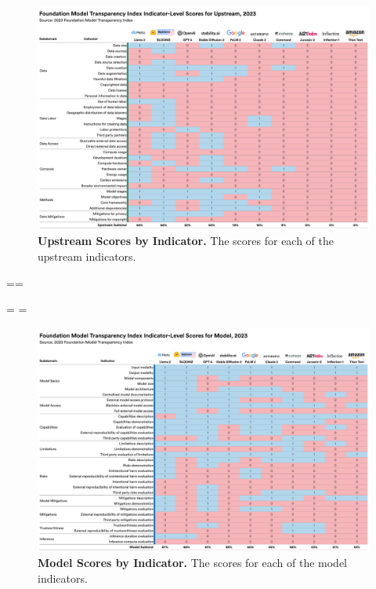 \begin{figure}
\begin{minipage}{\pdfpagewidth}
\includegraphics[keepaspectratio, width=0.85\pdfpagewidth]{figures/f10.pdf}
\end{minipage}
\caption{\textbf{Upstream Scores by Indicator.} The scores for each of the \numupstreamindicators upstream indicators.
}
\label{fig:upstream-scores}
\end{figure}

\clearpage

\eject
\pdfpagewidth=\originalwidth \pdfpageheight=\originalheight
{}



\eject
\pdfpageheight=\originalwidth
\setlength{\mylength}{\originalheight-3.4cm}
\pdfpagewidth=\mylength
{}

\begin{figure}
\begin{minipage}{\pdfpagewidth}
\includegraphics[keepaspectratio, width=0.85\pdfpagewidth]{figures/heatmap_allindicators_model-1.pdf}
\end{minipage}
\caption{\textbf{Model Scores by Indicator.} The scores for each of the \nummodelindicators model indicators.
}
\label{fig:model-scores}
\end{figure}

